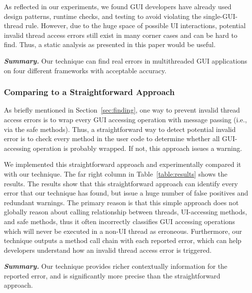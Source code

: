 As reflected in our experiments, we found GUI developers have already
used design patterns, runtime checks, and testing to avoid violating
the single-GUI-thread rule. However, due to the huge space of
possible UI interactions, potential
invalid thread access errors still exist in many corner cases and
can be hard to find. Thus, a static analysis as presented in this paper
would be useful.

\vspace{1mm}

\noindent \textbf{\textit{Summary.}} Our technique can find real errors
in multithreaded GUI applications on four different frameworks with
acceptable accuracy.

\subsubsection{Comparing to a Straightforward Approach}
\label{sec:straightforward}

As briefly mentioned in Section~\ref{sec:finding}, one way to prevent
invalid thread access errors is to wrap every GUI accessing operation
with message passing (i.e., via the safe methods). Thus, a
straightforward way to detect potential invalid error
is to check every method in the user code to determine whether all GUI-accessing operation
is probably wrapped. If not, this approach issues a warning.%

We implemented this straightforward approach and experimentally compared it
with our technique.%
The far right column in Table~\ref{table:results} shows the results.
The results show that this straightforward approach can identify every
error that our technique has found, but issue a huge number of false
positives and redundant warnings. The primary reason is that this simple approach
does not globally reason about calling relationship between
threads, UI-accessing methods, and safe methods, thus it often incorrectly
classifies GUI accessing operations which will never be executed
in a non-UI thread as erroneous. Furthermore, our technique
outputs a method call chain with each reported error, which can help
developers understand how an invalid thread access error is triggered.



\vspace{1mm}

\noindent \textbf{\textit{Summary.}} Our technique provides
richer contextually information for the reported error, and 
is significantly more precise than the straightforward approach.

